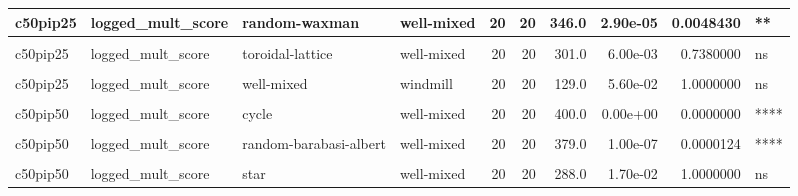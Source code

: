 \documentclass[
]{book}
\begin{document}
\begin{table}
\begin{tabular}{l|l|l|l|r|r|r|r|r|l}
\hline
c50pip25 & logged\_mult\_score & random-waxman & well-mixed & 20 & 20 & 346.0 & 2.90e-05 & 0.0048430 & **\\
\hline
\cellcolor{gray!6}{c50pip25} & \cellcolor{gray!6}{logged\_mult\_score} & \cellcolor{gray!6}{star} & \cellcolor{gray!6}{well-mixed} & \cellcolor{gray!6}{20} & \cellcolor{gray!6}{20} & \cellcolor{gray!6}{400.0} & \cellcolor{gray!6}{0.00e+00} & \cellcolor{gray!6}{0.0000000} & \cellcolor{gray!6}{****}\\
\hline
c50pip25 & logged\_mult\_score & toroidal-lattice & well-mixed & 20 & 20 & 301.0 & 6.00e-03 & 0.7380000 & ns\\
\hline
\cellcolor{gray!6}{c50pip25} & \cellcolor{gray!6}{logged\_mult\_score} & \cellcolor{gray!6}{well-mixed} & \cellcolor{gray!6}{wheel} & \cellcolor{gray!6}{20} & \cellcolor{gray!6}{20} & \cellcolor{gray!6}{35.0} & \cellcolor{gray!6}{1.10e-06} & \cellcolor{gray!6}{0.0002339} & \cellcolor{gray!6}{***}\\
\hline
c50pip25 & logged\_mult\_score & well-mixed & windmill & 20 & 20 & 129.0 & 5.60e-02 & 1.0000000 & ns\\
\hline
\cellcolor{gray!6}{c50pip50} & \cellcolor{gray!6}{logged\_mult\_score} & \cellcolor{gray!6}{comet-kite} & \cellcolor{gray!6}{well-mixed} & \cellcolor{gray!6}{20} & \cellcolor{gray!6}{20} & \cellcolor{gray!6}{400.0} & \cellcolor{gray!6}{0.00e+00} & \cellcolor{gray!6}{0.0000000} & \cellcolor{gray!6}{****}\\
\hline
c50pip50 & logged\_mult\_score & cycle & well-mixed & 20 & 20 & 400.0 & 0.00e+00 & 0.0000000 & ****\\
\hline
\cellcolor{gray!6}{c50pip50} & \cellcolor{gray!6}{logged\_mult\_score} & \cellcolor{gray!6}{linear-chain} & \cellcolor{gray!6}{well-mixed} & \cellcolor{gray!6}{20} & \cellcolor{gray!6}{20} & \cellcolor{gray!6}{400.0} & \cellcolor{gray!6}{0.00e+00} & \cellcolor{gray!6}{0.0000000} & \cellcolor{gray!6}{****}\\
\hline
c50pip50 & logged\_mult\_score & random-barabasi-albert & well-mixed & 20 & 20 & 379.0 & 1.00e-07 & 0.0000124 & ****\\
\hline
\cellcolor{gray!6}{c50pip50} & \cellcolor{gray!6}{logged\_mult\_score} & \cellcolor{gray!6}{random-waxman} & \cellcolor{gray!6}{well-mixed} & \cellcolor{gray!6}{20} & \cellcolor{gray!6}{20} & \cellcolor{gray!6}{399.0} & \cellcolor{gray!6}{0.00e+00} & \cellcolor{gray!6}{0.0000000} & \cellcolor{gray!6}{****}\\
\hline
c50pip50 & logged\_mult\_score & star & well-mixed & 20 & 20 & 288.0 & 1.70e-02 & 1.0000000 & ns\\

\end{tabular}
\end{table}
\end{document}

